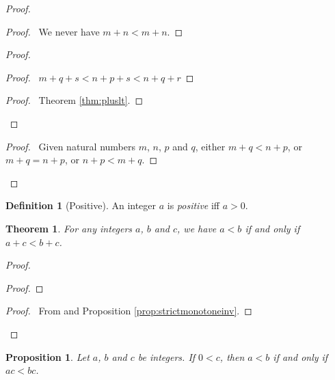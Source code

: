 \documentclass{book}
\let\qed\relax
\newtheorem{prop}[ax]{Proposition}
\newtheorem{thm}[ax]{Theorem}
\theoremstyle{definition}
\newtheorem{df}[ax]{Definition}
\begin{document}
\begin{proof}
	\pf
	\begin{proof}
		\pf\ We never have $m + n < m + n$.
	\end{proof}
	\begin{proof}
		\begin{proof}
			\pf\ $m + q + s < n + p + s < n + q + r$
		\end{proof}
		\begin{proof}
			\pf\ Theorem \ref{thm:pluslt}.
		\end{proof}
	\end{proof}
	\begin{proof}
		\pf\ Given natural numbers $m$, $n$, $p$ and $q$, either $m +q < n + p$, or $m + q = n + p$, or $n + p < m + q$.
	\end{proof}
	\qed
\end{proof}

\begin{df}[Positive]
An integer $a$ is \emph{positive} iff $a > 0$.
\end{df}

\begin{thm}
For any integers $a$, $b$ and $c$, we have $a < b$ if and only if $a + c < b + c$.
\end{thm}

\begin{proof}
\pf
{}
\begin{proof}
\end{proof}
\begin{proof}
	\pf\ From  and Proposition \ref{prop:strictmonotoneinv}.
\end{proof}
\qed
\end{proof}

\begin{prop}
Let $a$, $b$ and $c$ be integers. If $0 < c$, then $a < b$ if and only if $ac < bc$.
\end{prop}
\end{document}
